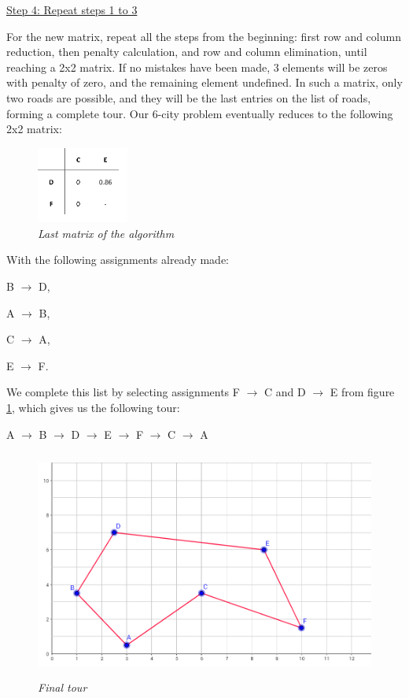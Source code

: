 \vspace{5mm}
\noindent
\underline{Step 4: Repeat steps 1 to 3}
\vspace{1mm}

\noindent
For the new matrix, repeat all the steps from the beginning: first row and column reduction, then penalty calculation, and row and column elimination, until reaching a 2x2 matrix. If no mistakes have been made, 3 elements will be zeros with penalty of zero, and the remaining element undefined. In such a matrix, only two roads are possible, and they will be the last entries on the list of roads, forming a complete tour. Our 6-city problem eventually reduces to the following 2x2 matrix:

\begin{figure}[H] 
	\centering
	\includegraphics[height=2.5cm]{2x2matrix}
	\vspace{-3mm}
	\caption{\textsl{Last matrix of the algorithm}}
	\label{2x2matrix}
\end{figure}

\noindent
With the following assignments already made:

\begin{center}
\par B $\rightarrow$ D, 
\par A $\rightarrow$ B, 
\par C $\rightarrow$ A, 
\par E $\rightarrow$ F.
\end{center}
\noindent
We complete this list by selecting assignments F $\rightarrow$ C and D $\rightarrow$ E from figure \ref{2x2matrix}, which gives us the following tour:

\begin{center}
A $\rightarrow$ B $\rightarrow$ D $\rightarrow$ E $\rightarrow$ F $\rightarrow$ C $\rightarrow$ A
\end{center}


\begin{figure}[H] 
	\centering
	\includegraphics[height=7.5cm]{6citytour}
	\caption{\textsl{Final tour}}
	\label{6citytour}
\end{figure}

